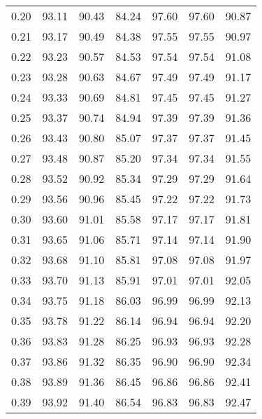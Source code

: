 \begin{tabular}{|c|c|c|c|c|c|c|}
      0.20 &     93.11 &     90.43 &      84.24 &   97.60 &      97.60 &         90.87 \\
      0.21 &     93.17 &     90.49 &      84.38 &   97.55 &      97.55 &         90.97 \\
      0.22 &     93.23 &     90.57 &      84.53 &   97.54 &      97.54 &         91.08 \\
      0.23 &     93.28 &     90.63 &      84.67 &   97.49 &      97.49 &         91.17 \\
      0.24 &     93.33 &     90.69 &      84.81 &   97.45 &      97.45 &         91.27 \\
      0.25 &     93.37 &     90.74 &      84.94 &   97.39 &      97.39 &         91.36 \\
      0.26 &     93.43 &     90.80 &      85.07 &   97.37 &      97.37 &         91.45 \\
      0.27 &     93.48 &     90.87 &      85.20 &   97.34 &      97.34 &         91.55 \\
      0.28 &     93.52 &     90.92 &      85.34 &   97.29 &      97.29 &         91.64 \\
      0.29 &     93.56 &     90.96 &      85.45 &   97.22 &      97.22 &         91.73 \\
      0.30 &     93.60 &     91.01 &      85.58 &   97.17 &      97.17 &         91.81 \\
      0.31 &     93.65 &     91.06 &      85.71 &   97.14 &      97.14 &         91.90 \\
      0.32 &     93.68 &     91.10 &      85.81 &   97.08 &      97.08 &         91.97 \\
      0.33 &     93.70 &     91.13 &      85.91 &   97.01 &      97.01 &         92.05 \\
      0.34 &     93.75 &     91.18 &      86.03 &   96.99 &      96.99 &         92.13 \\
      0.35 &     93.78 &     91.22 &      86.14 &   96.94 &      96.94 &         92.20 \\
      0.36 &     93.83 &     91.28 &      86.25 &   96.93 &      96.93 &         92.28 \\
      0.37 &     93.86 &     91.32 &      86.35 &   96.90 &      96.90 &         92.34 \\
      0.38 &     93.89 &     91.36 &      86.45 &   96.86 &      96.86 &         92.41 \\
      0.39 &     93.92 &     91.40 &      86.54 &   96.83 &      96.83 &         92.47 \\

\end{tabular}
